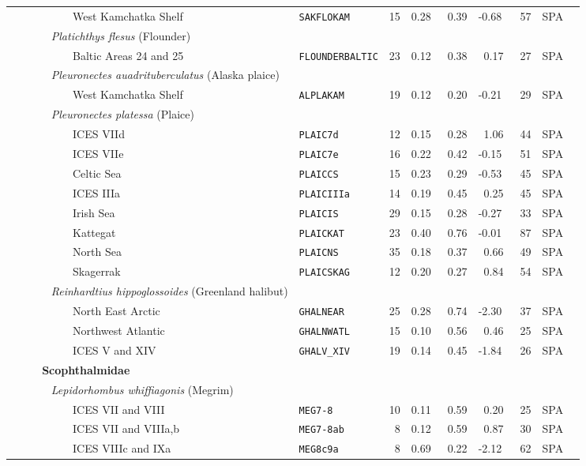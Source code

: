 \begin{flushleft}
\begin{tabular*}{7.1in}{llllllllll}
&~~~~~~~~~West Kamchatka Shelf&{\tt SAKFLOKAM}&15&0.28&~0.39&-0.68&~57&SPA  & \\ 
&{\it~~~~~Platichthys flesus} (Flounder)&~&~&~&~&~&~&~  & \\ 
&~~~~~~~~~Baltic Areas 24 and 25&{\tt FLOUNDERBALTIC}&23&0.12&~0.38&~0.17&~27&SPA  & \\ 
&{\it~~~~~Pleuronectes auadrituberculatus} (Alaska plaice)&~&~&~&~&~&~&~  & \\ 
&~~~~~~~~~West Kamchatka Shelf&{\tt ALPLAKAM}&19&0.12&~0.20&-0.21&~29&SPA  & \\ 
&{\it~~~~~Pleuronectes platessa} (Plaice)&~&~&~&~&~&~&~  & \\ 
&~~~~~~~~~ICES VIId&{\tt PLAIC7d}&12&0.15&~0.28&~1.06&~44&SPA  & \\ 
&~~~~~~~~~ICES VIIe&{\tt PLAIC7e}&16&0.22&~0.42&-0.15&~51&SPA  & \\ 
&~~~~~~~~~Celtic Sea&{\tt PLAICCS}&15&0.23&~0.29&-0.53&~45&SPA  & \\ 
&~~~~~~~~~ICES IIIa&{\tt PLAICIIIa}&14&0.19&~0.45&~0.25&~45&SPA  & \\ 
&~~~~~~~~~Irish Sea&{\tt PLAICIS}&29&0.15&~0.28&-0.27&~33&SPA  & \\ 
&~~~~~~~~~Kattegat&{\tt PLAICKAT}&23&0.40&~0.76&-0.01&~87&SPA  & \\ 
&~~~~~~~~~North Sea&{\tt PLAICNS}&35&0.18&~0.37&~0.66&~49&SPA  & \\ 
&~~~~~~~~~Skagerrak&{\tt PLAICSKAG}&12&0.20&~0.27&~0.84&~54&SPA  & \\ 
&{\it~~~~~Reinhardtius hippoglossoides} (Greenland halibut)&~&~&~&~&~&~&~  & \\ 
&~~~~~~~~~North East Arctic&{\tt GHALNEAR}&25&0.28&~0.74&-2.30&~37&SPA  & \\ 
&~~~~~~~~~Northwest Atlantic&{\tt GHALNWATL}&15&0.10&~0.56&~0.46&~25&SPA  & \\ 
&~~~~~~~~~ICES V and XIV&{\tt GHALV\_XIV}&19&0.14&~0.45&-1.84&~26&SPA  & \\ 
&{\bf~~~Scophthalmidae}&~&~&~&~&~&~&~  & \\ 
&{\it~~~~~Lepidorhombus whiffiagonis} (Megrim)&~&~&~&~&~&~&~  & \\ 
&~~~~~~~~~ICES VII and VIII&{\tt MEG7-8}&10&0.11&~0.59&~0.20&~25&SPA  & \\ 
&~~~~~~~~~ICES VII and VIIIa,b&{\tt MEG7-8ab}&~8&0.12&~0.59&~0.87&~30&SPA  & \\ 
&~~~~~~~~~ICES VIIIc and IXa&{\tt MEG8c9a}&~8&0.69&~0.22&-2.12&~62&SPA  & \\ 
\end{tabular*} 
\end{flushleft}
